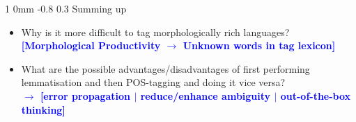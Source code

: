 \documentclass[11pt]{article}
\makeatletter
\newcommand{\newsec}[1]{\section{#1}\noindent}
\renewcommand{\section}{\@startsection
{section}%
{1}%
{0mm}%
{-0.8\baselineskip}%
{0.3\baselineskip}%
{\bfseries\large}}%
\makeatother
\begin{document}
\newsec{Summing up}%

\begin{itemize}
\item Why is it more difficult to tag morphologically rich
  languages?\\\textbf{\textcolor{blue}{[Morphological Productivity
      $\rightarrow$ Unknown words in tag lexicon]}}
\item What are the possible advantages/disadvantages of first
  performing lemmatisation and then POS-tagging and doing it vice
  versa? \\\textbf{\textcolor{blue}{$\rightarrow$ [error propagation
      $|$ reduce/enhance ambiguity $|$ out-of-the-box thinking]}}
\end{itemize}
\end{document}
